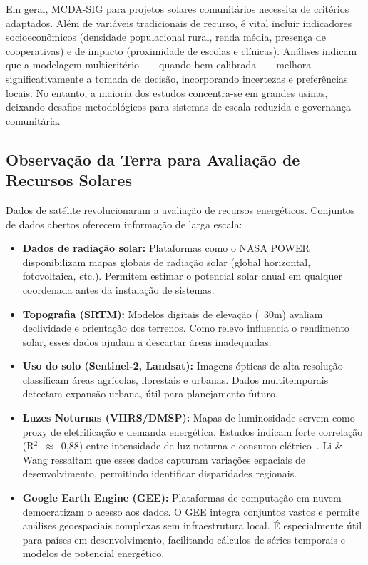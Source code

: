 \documentclass[12pt, a4paper]{article}
\begin{document}
Em geral, MCDA-SIG para projetos solares comunitários necessita de critérios adaptados. Além de variáveis tradicionais de recurso, é vital incluir indicadores socioeconômicos (densidade populacional rural, renda média, presença de cooperativas) e de impacto (proximidade de escolas e clínicas). Análises indicam que a modelagem multicritério~---~quando bem calibrada~---~melhora significativamente a tomada de decisão, incorporando incertezas e preferências locais. No entanto, a maioria dos estudos concentra-se em grandes usinas, deixando desafios metodológicos para sistemas de escala reduzida e governança comunitária.

\subsection{Observação da Terra para Avaliação de Recursos Solares}

Dados de satélite revolucionaram a avaliação de recursos energéticos. Conjuntos de dados abertos oferecem informação de larga escala:

\begin{itemize}
\item \textbf{Dados de radiação solar:} Plataformas como o NASA POWER disponibilizam mapas globais de radiação solar (global horizontal, fotovoltaica, etc.). Permitem estimar o potencial solar anual em qualquer coordenada antes da instalação de sistemas.
\item \textbf{Topografia (SRTM):} Modelos digitais de elevação (~30m) avaliam declividade e orientação dos terrenos. Como relevo influencia o rendimento solar, esses dados ajudam a descartar áreas inadequadas.
\item \textbf{Uso do solo (Sentinel-2, Landsat):} Imagens ópticas de alta resolução classificam áreas agrícolas, florestais e urbanas. Dados multitemporais detectam expansão urbana, útil para planejamento futuro.
\item \textbf{Luzes Noturnas (VIIRS/DMSP):} Mapas de luminosidade servem como proxy de eletrificação e demanda energética. Estudos indicam forte correlação (R$^2$~$\approx$~0,88) entre intensidade de luz noturna e consumo elétrico~\citep{Li2025}. Li \& Wang ressaltam que esses dados capturam variações espaciais de desenvolvimento, permitindo identificar disparidades regionais.
\item \textbf{Google Earth Engine (GEE):} Plataformas de computação em nuvem democratizam o acesso aos dados. O GEE integra conjuntos vastos e permite análises geoespaciais complexas sem infraestrutura local. É especialmente útil para países em desenvolvimento, facilitando cálculos de séries temporais e modelos de potencial energético.
\end{itemize}
\end{document}
